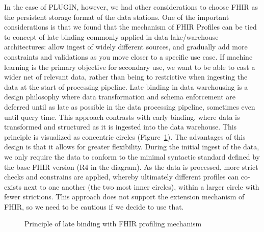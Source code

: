 \documentclass[
  authoryear]{elsarticle}
\begin{document}
In the case of PLUGIN, however, we had other considerations to choose
FHIR as the persistent storage format of the data stations. One of the
important considerations is that we found that the mechanism of FHIR
Profiles can be tied to concept of late binding commonly applied in data
lake/warehouse architectures: allow ingest of widely different sources,
and gradually add more constraints and validations as you move closer to
a specific use case. If machine learning is the primary objective for
secondary use, we want to be able to cast a wider net of relevant data,
rather than being to restrictive when ingesting the data at the start of
processing pipeline. Late binding in data warehousing is a design
philosophy where data transformation and schema enforcement are deferred
until as late as possible in the data processing pipeline, sometimes
even until query time. This approach contrasts with early binding, where
data is transformed and structured as it is ingested into the data
warehouse. This principle is visualized as concentric circles
(Figure~\ref{fig-late-binding}). The advantages of this design is that
it allows for greater flexibility. During the initial ingest of the
data, we only require the data to conform to the minimal syntactic
standard defined by the base FHIR version (R4 in the diagram). As the
data is processed, more strict checks and constrains are applied,
whereby ultimately different profiles can co-exists next to one another
(the two most inner circles), within a larger circle with fewer
strictions. This approach does not support the extension mechanism of
FHIR, so we need to be cautious if we decide to use that.

\begin{figure}


\caption{\label{fig-late-binding}Principle of late binding with FHIR
profiling mechanism}

\end{figure}%
\end{document}
